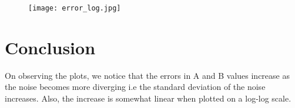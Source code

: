 \documentclass[11pt, a4paper]{article}
\begin{document}
\begin{figure}[H]
     \centering
     \texttt{[image: error\_log.jpg]}
\end{figure}

\section{Conclusion}
On observing the plots, we notice that the errors in A and B values increase as the noise becomes more diverging i.e the standard deviation of the noise increases. Also, the increase is somewhat linear when plotted on a log-log scale. 
\end{document}
